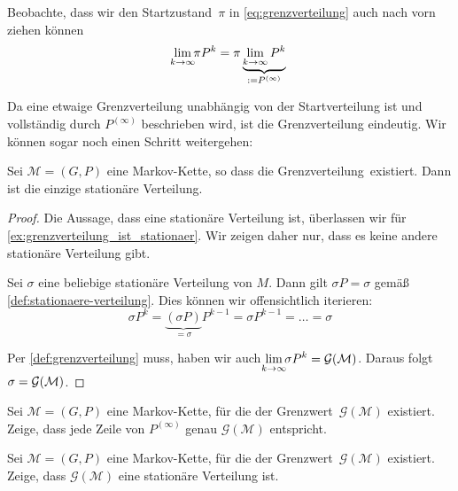 \noindent
Beobachte, dass wir den Startzustand~$\pi$ in \cref{eq:grenzverteilung} auch nach vorn ziehen können
\begin{equation}
    \smashoperator{\lim_{k \to \infty}} \pi P^k = \pi \underbrace{\lim_{k \to \infty} P^k}_{:= P^{(\infty)}}
\end{equation}

Da eine etwaige Grenzverteilung unabhängig von der Startverteilung ist und vollständig durch $P^{(\infty)}$ beschrieben wird, ist die Grenzverteilung eindeutig.
Wir können sogar noch einen Schritt weitergehen:

\begin{lemma}\label{lem:grenzverteilung_ist_eindeutige_stationaere_verteilung}
    Sei $\mathcal M = (G, P)$ eine Markov-Kette, so dass die Grenzverteilung~\grenz existiert.
    Dann ist \grenz die einzige stationäre Verteilung.
\end{lemma}

\begin{proof}
    Die Aussage, dass \grenz eine stationäre Verteilung ist, überlassen wir für \cref{ex:grenzverteilung_ist_stationaer}.
    Wir zeigen daher nur, dass es keine andere stationäre Verteilung gibt.

    Sei $\sigma$ eine beliebige stationäre Verteilung von $M$.
    Dann gilt $\sigma P = \sigma$ gemäß \cref{def:stationaere-verteilung}.
    Dies können wir offensichtlich iterieren:
    \begin{equation}
        \sigma P^k = \underbrace{(\sigma P)}_{=\sigma} P^{k-1} = \sigma P^{k-1} = \ldots = \sigma
    \end{equation}

    \noindent
    Per \cref{def:grenzverteilung} muss, haben wir auch $\smashoperator{\lim_{k \to \infty}} \sigma P^k = \grenz$.
    Daraus folgt $\sigma = \mathcal G(\mathcal M)$.
\end{proof}

\begin{exercise}\label{ex:jede_zeile_grenzverteilung}
    Sei $\mathcal M = (G, P)$ eine Markov-Kette, für die der Grenzwert~$\mathcal G(\mathcal M)$ existiert.
    Zeige, dass jede Zeile von $P^{(\infty)}$ genau $\mathcal G(\mathcal M)$ entspricht.
\end{exercise}

\begin{exercise}\label{ex:grenzverteilung_ist_stationaer}
    Sei $\mathcal M = (G, P)$ eine Markov-Kette, für die der Grenzwert~$\mathcal G(\mathcal M)$ existiert.
    Zeige, dass $\mathcal G(\mathcal M)$ eine stationäre Verteilung ist.
\end{exercise}


